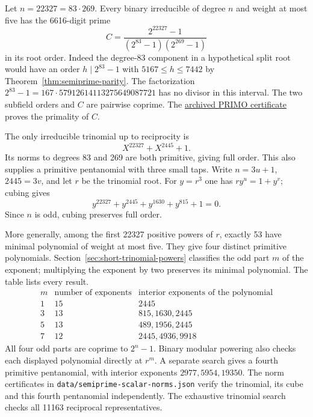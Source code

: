 \documentclass[11pt]{article}
\begin{document}
Let \(n=22327=83\cdot269\). Every binary irreducible of degree \(n\)
and weight at most five has the 6616-digit prime
\[
                  C=\frac{2^{22327}-1}{(2^{83}-1)(2^{269}-1)}
\]
in its root order. Indeed the degree-83 component in a hypothetical
split root would have an order \(h\mid2^{83}-1\) with
\(5167\le h\le7442\) by Theorem~\ref{thm:semiprime-parity}.
The factorization
\(2^{83}-1=167\cdot57912614113275649087721\) has no divisor in
this interval. The two subfield orders and \(C\) are pairwise coprime.
The \href{https://factordb.com/cert/1100000000006998360}{archived
PRIMO certificate} proves the primality of \(C\).

The only irreducible trinomial up to reciprocity is
\[
                  X^{22327}+X^{2445}+1.
\]
Its norms to degrees 83 and 269 are both primitive, giving full order.
This also supplies a primitive pentanomial with three small taps.
Write \(n=3u+1\), \(2445=3v\), and let \(r\) be the trinomial root.
For \(y=r^3\) one has \(r y^u=1+y^v\); cubing gives
\[
                  y^{22327}+y^{2445}+y^{1630}+y^{815}+1=0.
\]
Since \(n\) is odd, cubing preserves full order.

More generally, among the first 22327 positive powers of \(r\),
exactly 53 have minimal polynomial of weight at most five. They give
four distinct primitive polynomials. Section~\ref{sec:short-trinomial-powers}
classifies the odd part \(m\) of the exponent; multiplying the exponent
by two preserves its minimal polynomial. The table lists every result.
\[
\begin{array}{r|r|l}
 m&\text{number of exponents}&\text{interior exponents of the polynomial}\\\hline
 1&15&2445\\
 3&13&815,1630,2445\\
 5&13&489,1956,2445\\
 7&12&2445,4936,9918
\end{array}
\]
All four odd parts are coprime to \(2^n-1\). Binary modular powering
also checks each displayed polynomial directly at \(r^m\).
A separate search gives a fourth primitive pentanomial, with interior
exponents \(2977,5954,19350\). The norm certificates in
\nolinkurl{data/semiprime-scalar-norms.json} verify the trinomial, its
cube and this fourth pentanomial independently. The exhaustive
trinomial search checks all 11163 reciprocal representatives.

\clearpage
\end{document}
